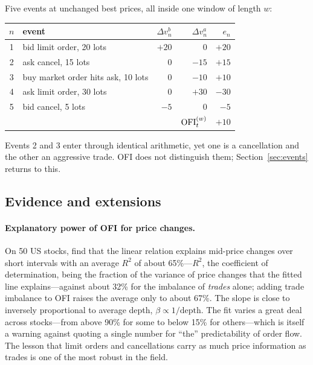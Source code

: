 \begin{example}
\label{ex:ofi}
Five events at unchanged best prices, all inside one window of length $w$:
\begin{center}\small
\begin{tabular}{clrrr}
\toprule
$n$ & event & $\Delta v^b_n$ & $\Delta v^a_n$ & $e_n$ \\
\midrule
1 & bid limit order, 20 lots & $+20$ & $0$ & $+20$ \\
2 & ask cancel, 15 lots & $0$ & $-15$ & $+15$ \\
3 & buy market order hits ask, 10 lots & $0$ & $-10$ & $+10$ \\
4 & ask limit order, 30 lots & $0$ & $+30$ & $-30$ \\
5 & bid cancel, 5 lots & $-5$ & $0$ & $-5$ \\
\midrule
 & & & $\mathrm{OFI}^{(w)}_t$ & $+10$ \\
\bottomrule
\end{tabular}
\end{center}
Events 2 and 3 enter through identical arithmetic, yet one is a cancellation and the other an
aggressive trade. OFI does not distinguish them; Section~\ref{sec:events} returns to this.
\end{example}

\subsection{Evidence and extensions}

\paragraph{Explanatory power of OFI for price changes.} On 50 US stocks, \citet{cks2014} find that the
linear relation explains mid-price changes over short intervals with an average $R^2$ of about
65\%---$R^2$, the coefficient of determination, being the fraction of the variance of price changes
that the fitted line explains---against about 32\% for the imbalance of \emph{trades} alone; adding
trade imbalance to OFI raises the average only to about 67\%. The slope is close to inversely
proportional to average depth, $\beta \propto 1/\text{depth}$. The fit varies a great deal across
stocks---from above 90\% for some to below 15\% for others---which is itself a warning against
quoting a single number for ``the'' predictability of order flow. The lesson that limit orders and
cancellations carry as much price information as trades is one of the most robust in the field.

